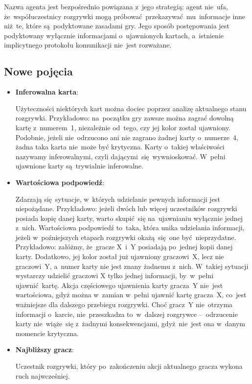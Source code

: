 \documentclass[declaration,shortabstract,inz]{iithesis}
\begin{document}
Nazwa agenta jest bezpośrednio powiązana z~jego strategią: agent nie~ufa, że~współuczestnicy rozgrywki mogą próbować przekazywać mu~informacje inne niż~te, które są~podyktowane zasadami gry. Jego sposób postępowania jest podyktowany wyłącznie informacjami o~ujawnionych kartach, a~istnienie implicytnego protokołu komunikacji nie~jest rozważane.

\subsection*{Nowe pojęcia}

\begin{itemize}
	\item \textbf{Inferowalna karta}:

	Użyteczności niektórych kart można dociec poprzez analizę aktualnego stanu rozgrywki. Przykładowo: na~początku gry zawsze można zagrać dowolną kartę z~numerem~1, niezależnie od~tego, czy jej kolor został ujawniony. Podobnie, jeżeli nie~odrzucono ani nie zagrano żadnej karty o~numerze~4, żadna taka karta nie~może być krytyczna. Karty o~takiej właściwości nazywamy inferowalnymi, czyli dającymi~się wywnioskować. W~pełni ujawnione karty są~trywialnie inferowalne.
	
	\item \textbf{Wartościowa podpowiedź}:
	
	Zdarzają się~sytuacje, w~których udzielanie pewnych informacji jest niepożądane. Przykładowo: jeżeli dwóch lub więcej uczestników rozgrywki posiada kopię danej karty, warto skupić~się na~ujawnianiu wyłącznie jednej z~nich. Wartościowa podpowiedź to~taka, która unika udzielania informacji, jeżeli w~poźniejszych etapach rozgrywki okażą~się one być nieprzydatne. Przykładowo: załóżmy, że~gracze X~i~Y posiadają po~jednej kopii danej karty. Dodatkowo, jej kolor został już ujawniony graczowi~X, lecz nie graczowi~Y, a~numer karty nie jest znany żadnemu z~nich. W~takiej sytuacji wystarczy udzielić graczowi X tylko jednej informacji, by~w~pełni ujawnić kartę. Akcja częściowego ujawnienia karty gracza~Y nie~jest wartościowa, gdyż można w~zamian w~pełni ujawnić kartę gracza~X, co~jest ważniejsze dla dalszego przebiegu rozgrywki. Choć gracz~Y nie~otrzyma informacji o~karcie, nie~przeszkadza to~w~dalszej rozgrywce --~odrzucenie karty nie~wiąże~się z~żadnymi konsekwencjami, gdyż~nie~jest ona w~danym momencie krytyczna.

	\item \textbf{Najbliższy gracz}:
	
	Uczestnik rozgrywki, który po~zakończeniu akcji aktualnego gracza wykona ruch najwcześniej.
	
\end{itemize}
\end{document}
